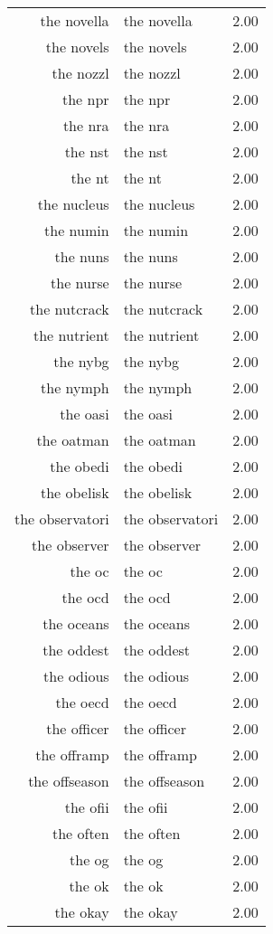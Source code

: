 \begin{table}[ht]
\begin{tabular}{rlr}
  the novella & the novella & 2.00 \\ 
  the novels & the novels & 2.00 \\ 
  the nozzl & the nozzl & 2.00 \\ 
  the npr & the npr & 2.00 \\ 
  the nra & the nra & 2.00 \\ 
  the nst & the nst & 2.00 \\ 
  the nt & the nt & 2.00 \\ 
  the nucleus & the nucleus & 2.00 \\ 
  the numin & the numin & 2.00 \\ 
  the nuns & the nuns & 2.00 \\ 
  the nurse & the nurse & 2.00 \\ 
  the nutcrack & the nutcrack & 2.00 \\ 
  the nutrient & the nutrient & 2.00 \\ 
  the nybg & the nybg & 2.00 \\ 
  the nymph & the nymph & 2.00 \\ 
  the oasi & the oasi & 2.00 \\ 
  the oatman & the oatman & 2.00 \\ 
  the obedi & the obedi & 2.00 \\ 
  the obelisk & the obelisk & 2.00 \\ 
  the observatori & the observatori & 2.00 \\ 
  the observer & the observer & 2.00 \\ 
  the oc & the oc & 2.00 \\ 
  the ocd & the ocd & 2.00 \\ 
  the oceans & the oceans & 2.00 \\ 
  the oddest & the oddest & 2.00 \\ 
  the odious & the odious & 2.00 \\ 
  the oecd & the oecd & 2.00 \\ 
  the officer & the officer & 2.00 \\ 
  the offramp & the offramp & 2.00 \\ 
  the offseason & the offseason & 2.00 \\ 
  the ofii & the ofii & 2.00 \\ 
  the often & the often & 2.00 \\ 
  the og & the og & 2.00 \\ 
  the ok & the ok & 2.00 \\ 
  the okay & the okay & 2.00 \\ 

\end{tabular}
\end{table}

